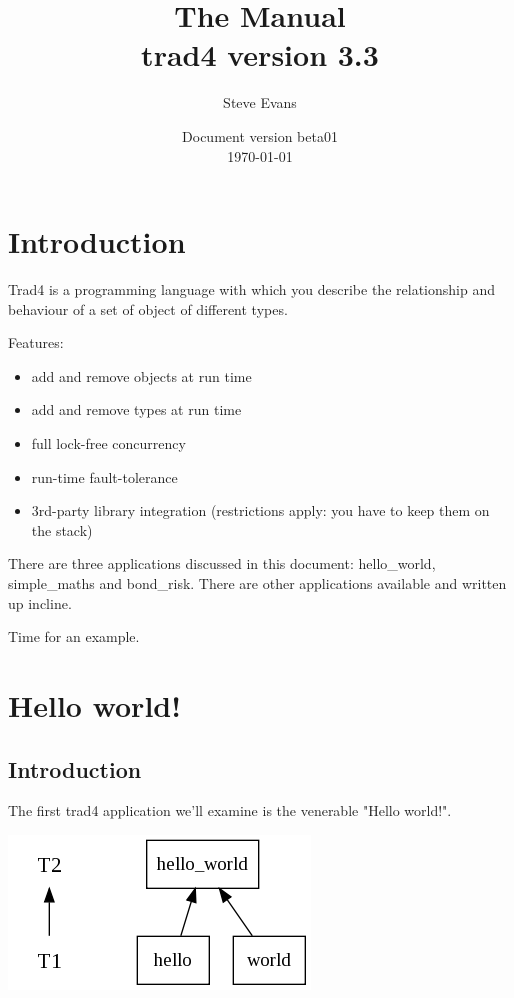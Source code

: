 \documentclass{report}
\begin{document}
\title{The Manual \\
{\large \textbf{trad4 version 3.3}}}

\author{Steve Evans}

\date{Document version beta01 \\
\today}

\maketitle



\setcounter{tocdepth}{1}
\tableofcontents

\chapter{Introduction}

Trad4 is a programming language with which you describe the relationship and behaviour of a set of object of different types. 

Features:

\begin{itemize}
\item add and remove objects at run time
\item add and remove types at run time
\item full lock-free concurrency
\item run-time fault-tolerance
\item 3rd-party library integration (restrictions apply: you have to keep them on the stack)
\end{itemize}

There are three applications discussed in this document: hello_world, simple_maths and bond_risk. There are other applications available and written up incline.

Time for an example.

\chapter{Hello world!}

\section{Introduction}

The first trad4 application we'll examine is the venerable "Hello world!".

\includegraphics[scale=0.5]{helloworldabstract.png}
\end{document}
